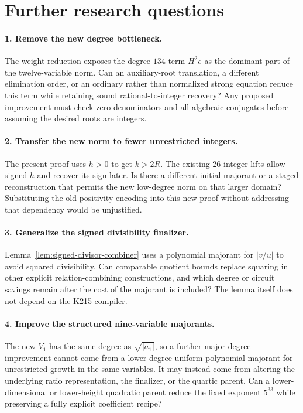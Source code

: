 \section{Further research questions}

\paragraph{1. Remove the new degree bottleneck.}
The weight reduction exposes the degree-$134$ term $H^2e$ as the dominant
part of the twelve-variable norm. Can an auxiliary-root translation, a
different elimination order, or an ordinary rather than normalized strong
equation reduce this term while retaining sound rational-to-integer
recovery? Any proposed improvement must check zero denominators and all
algebraic conjugates before assuming the desired roots are integers.

\paragraph{2. Transfer the new norm to fewer unrestricted integers.}
The present proof uses $h>0$ to get $k>2R$. The existing 26-integer lifts
allow signed $h$ and recover its sign later. Is there a different initial
majorant or a staged reconstruction that permits the new low-degree norm
on that larger domain? Substituting the old positivity encoding into this
new proof without addressing that dependency would be unjustified.

\paragraph{3. Generalize the signed divisibility finalizer.}
Lemma~\ref{lem:signed-divisor-combiner} uses a polynomial majorant for
$|v/u|$ to avoid squared divisibility. Can comparable quotient bounds
replace squaring in other explicit relation-combining constructions, and
which degree or circuit savings remain after the cost of the majorant is
included? The lemma itself does not depend on the K215 compiler.

\paragraph{4. Improve the structured nine-variable majorants.}
The new $V_1$ has the same degree as $\sqrt{|a_1|}$, so a further major
degree improvement cannot come from a lower-degree uniform polynomial
majorant for unrestricted growth in the same variables. It may instead
come from altering the underlying ratio representation, the finalizer, or
the quartic parent. Can a lower-dimensional or lower-height quadratic
parent reduce the fixed exponent $5^{33}$ while preserving a fully explicit
coefficient recipe?

